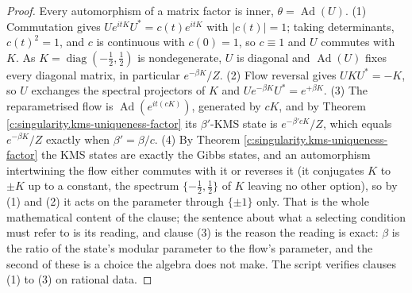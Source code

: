 \documentclass[11pt]{article}
\theoremstyle{definition}
\theoremstyle{plain}
\begin{document}
\begin{proof}
Every automorphism of a matrix factor is inner, $\theta = \operatorname{Ad}(U)$. (1) Commutation gives $Ue^{itK}U^{*} = c(t)e^{itK}$ with $|c(t)| = 1$; taking determinants, $c(t)^{2} = 1$, and $c$ is continuous with $c(0) = 1$, so $c \equiv 1$ and $U$ commutes with $K$. As $K = \operatorname{diag}(-\tfrac12, \tfrac12)$ is nondegenerate, $U$ is diagonal and $\operatorname{Ad}(U)$ fixes every diagonal matrix, in particular $e^{-\beta K}/Z$. (2) Flow reversal gives $UKU^{*} = -K$, so $U$ exchanges the spectral projectors of $K$ and $Ue^{-\beta K}U^{*} = e^{+\beta K}$. (3) The reparametrised flow is $\operatorname{Ad}(e^{it(cK)})$, generated by $cK$, and by Theorem \ref{c:singularity.kms-uniqueness-factor} its $\beta'$-KMS state is $e^{-\beta' cK}/Z$, which equals $e^{-\beta K}/Z$ exactly when $\beta' = \beta/c$. (4) By Theorem \ref{c:singularity.kms-uniqueness-factor} the KMS states are exactly the Gibbs states, and an automorphism intertwining the flow either commutes with it or reverses it (it conjugates $K$ to $\pm K$ up to a constant, the spectrum $\{-\tfrac12, \tfrac12\}$ of $K$ leaving no other option), so by (1) and (2) it acts on the parameter through $\{\pm 1\}$ only. That is the whole mathematical content of the clause; the sentence about what a selecting condition must refer to is its reading, and clause (3) is the reason the reading is exact: $\beta$ is the ratio of the state's modular parameter to the flow's parameter, and the second of these is a choice the algebra does not make. The script verifies clauses (1) to (3) on rational data.

\end{proof}
\end{document}
